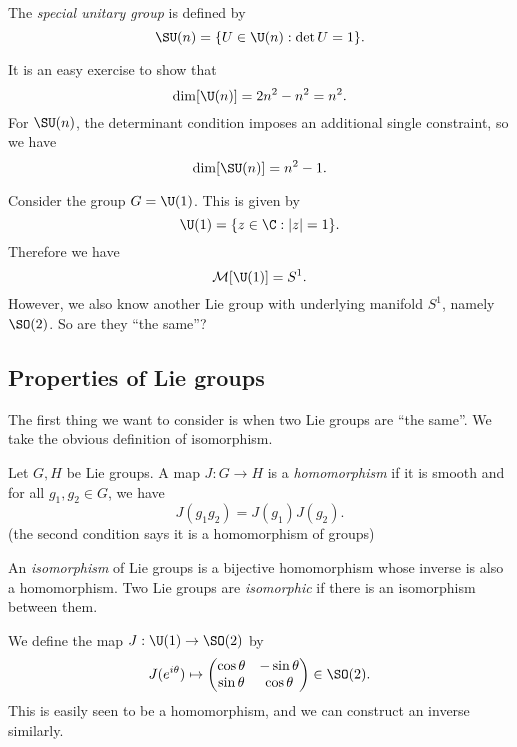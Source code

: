 \documentclass[a4paper]{article}
\begin{document}
\begin{defi}
  The \emph{special unitary group} is defined by
  \[
    \SU(n) = \{U \in \U(n): \det U = 1\}.
  \]
\end{defi}

It is an easy exercise to show that
\[
  \dim[\U(n)] = 2n^2 - n^2 = n^2.
\]
For $\SU(n)$, the determinant condition imposes an additional single constraint, so we have
\[
  \dim[\SU(n)] = n^2 - 1.
\]
\begin{eg}
  Consider the group $G = \U(1)$. This is given by
  \[
    \U(1) = \{z \in \C: |z| = 1\}.
  \]
  Therefore we have
  \[
    \mathcal{M}[\U(1)] = S^1.
  \]
  However, we also know another Lie group with underlying manifold $S^1$, namely $\SO(2)$. So are they ``the same''?
\end{eg}

\subsection{Properties of Lie groups}
The first thing we want to consider is when two Lie groups are ``the same''. We take the obvious definition of isomorphism.
\begin{defi}
  Let $G, H$ be Lie groups. A map $J: G \to H$ is a \emph{homomorphism} if it is smooth and for all $g_1, g_2 \in G$, we have
  \[
    J(g_1 g_2) = J(g_1) J(g_2).
  \]
  (the second condition says it is a homomorphism of groups)
\end{defi}

\begin{defi}
  An \emph{isomorphism} of Lie groups is a bijective homomorphism whose inverse is also a homomorphism. Two Lie groups are \emph{isomorphic} if there is an isomorphism between them.
\end{defi}

\begin{eg}
  We define the map $J: \U(1) \to \SO(2)$ by
  \[
    J(e^{i\theta}) \mapsto
    \begin{pmatrix}
      \cos \theta & -\sin \theta\\
      \sin \theta & \cos \theta
    \end{pmatrix} \in \SO(2).
  \]
  This is easily seen to be a homomorphism, and we can construct an inverse similarly.
\end{eg}
\end{document}
